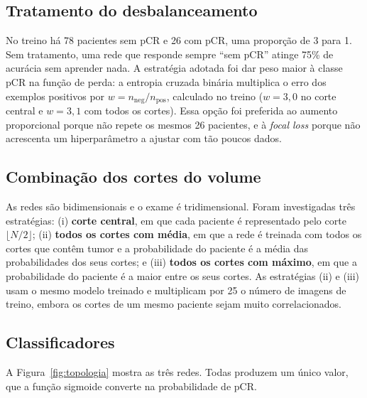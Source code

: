 \documentclass[12pt]{article}
\begin{document}
\subsection{Tratamento do desbalanceamento}

No treino há 78 pacientes sem pCR e 26 com pCR, uma proporção de 3 para 1. Sem tratamento, uma rede que
responde sempre ``sem pCR'' atinge 75\% de acurácia sem aprender nada. A estratégia adotada foi dar peso
maior à classe pCR na função de perda: a entropia cruzada binária multiplica o erro dos exemplos positivos
por $w = n_{\text{neg}} / n_{\text{pos}}$, calculado no treino ($w = 3{,}0$ no corte central e $w = 3{,}1$
com todos os cortes). Essa opção foi preferida ao aumento proporcional porque não repete os mesmos 26
pacientes, e à \textit{focal loss} porque não acrescenta um hiperparâmetro a ajustar com tão poucos dados.

\subsection{Combinação dos cortes do volume}

As redes são bidimensionais e o exame é tridimensional. Foram investigadas três estratégias:
(i) \textbf{corte central}, em que cada paciente é representado pelo corte $\lfloor N/2 \rfloor$;
(ii) \textbf{todos os cortes com média}, em que a rede é treinada com todos os cortes que contêm tumor e a
probabilidade do paciente é a média das probabilidades dos seus cortes; e (iii) \textbf{todos os cortes
com máximo}, em que a probabilidade do paciente é a maior entre os seus cortes. As estratégias (ii) e
(iii) usam o mesmo modelo treinado e multiplicam por 25 o número de imagens de treino, embora os cortes de
um mesmo paciente sejam muito correlacionados.

\subsection{Classificadores}

A Figura~\ref{fig:topologia} mostra as três redes. Todas produzem um único valor, que a função sigmoide
converte na probabilidade de pCR.
\end{document}
